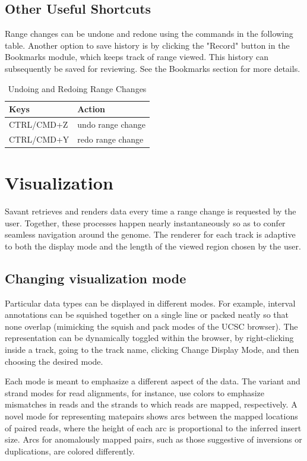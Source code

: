 \documentclass{report}
\begin{document}
\section{Other Useful Shortcuts}

Range changes can be undone and redone using the commands in the following table. Another option to save history is by clicking the "Record" button in the Bookmarks module, which keeps track of range viewed. This history can subsequently be saved for reviewing. See the Bookmarks section for more details.

\begin{table}[h] 
\caption{Undoing and Redoing Range Changes}  
\begin{tabular*}{6in}{ l l }  
\hline                      
Keys & Action \\
\hline                    
CTRL/CMD+Z & undo range change  \\
CTRL/CMD+Y & redo range change \\ 
\hline     
\end{tabular*} 
\end{table} 

\chapter{Visualization}

Savant retrieves and renders data every time a range change is requested by the user. Together, these processes happen nearly instantaneously so as to confer seamless navigation around the genome. The renderer for each track is adaptive to both the display mode and the length of the viewed region chosen by the user.

\section{Changing visualization mode}

Particular data types can be displayed in different modes. For example, interval annotations can be squished together on a single line or packed neatly so that none overlap (mimicking the squish and pack modes of the UCSC browser). The representation can be dynamically toggled within the browser, by right-clicking inside a track, going to the track name, clicking Change Display Mode, and then choosing the desired mode. 

Each mode is meant to emphasize a different aspect of the data. The variant and strand modes for read alignments, for instance, use colors to
emphasize mismatches in reads and the strands to which reads are mapped, respectively. A novel mode for representing matepairs shows arcs between the mapped locations of paired reads, where the height of each arc is proportional to the inferred insert size. Arcs for anomalously mapped pairs, such as those suggestive of inversions or duplications, are colored differently.
\end{document}
